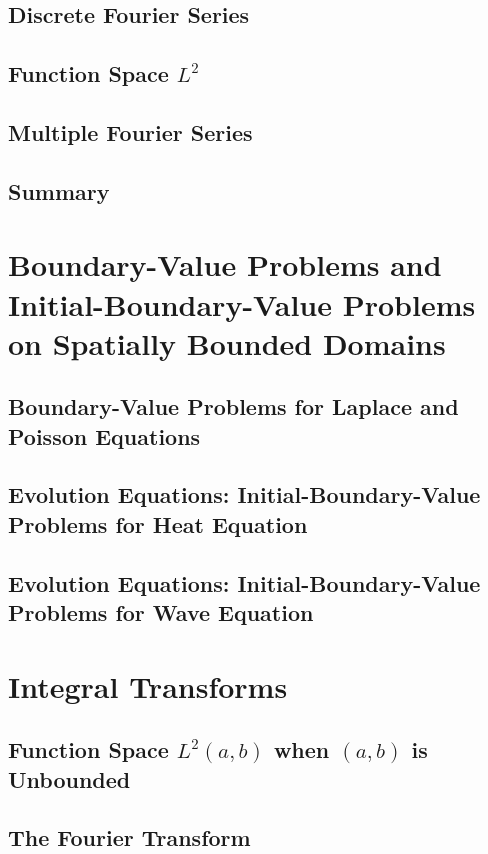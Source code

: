\documentclass{amsbook}%
\theoremstyle{plain}
\numberwithin{equation}{section}
\begin{document}
	
	\section{Discrete Fourier Series}
	
	\section{Function Space $L^2$}
	
	\section{Multiple Fourier Series}
	
	\section{Summary}

\chapter{Boundary-Value Problems and Initial-Boundary-Value Problems on Spatially Bounded Domains}

	\section{Boundary-Value Problems for Laplace and Poisson Equations}
	
	\section{Evolution Equations: Initial-Boundary-Value Problems for Heat Equation}
	
	\section{Evolution Equations: Initial-Boundary-Value Problems for Wave Equation}

\chapter{Integral Transforms}
	
	\section{Function Space $L^2(a,b)$ when $(a,b)$ is Unbounded}
	
	\section{The Fourier Transform}
	
\end{document}
